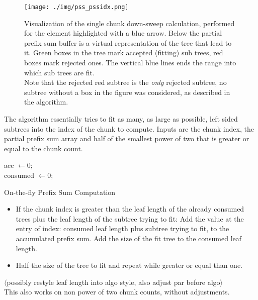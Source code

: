 \documentclass{tudscrreprt}
\newcommand{\markr}[1]{\textcolor{review}{$\langle$#1$\rangle$}}
\begin{document}
				\begin{figure}[!ht]
					\centering
					\texttt{[image: ./img/pss\_pssidx.png]}
					\caption{\label{fig:pss_pssidx}Visualization of the single chunk down-sweep calculation, performed for the element highlighted with a blue arrow. Below the partial prefix sum buffer is a virtual representation of the tree that lead to it. Green boxes in the tree mark accepted (fitting) sub trees, red boxes mark rejected ones. The vertical blue lines ends the range into which sub trees are fit. \\ Note that the rejected red subtree is the \emph{only} rejected subtree, no subtree without a box in the figure was considered, as described in the algorithm.}
				\end{figure}
				The algorithm essentially tries to fit as many, as large as possible, left sided subtrees into the index of the chunk to compute. Inputs are the chunk index, the partial prefix sum array and half of the smallest power of two that is greater or equal to the chunk count.
				\begin{algorithm}[!ht]
					\SetAlgoLined
					acc $\gets 0$; \\
					consumed $\gets 0$; \\
					\caption{On-the-fly Prefix Sum Computation}
				\end{algorithm}
				\begin{itemize}
					\item If the chunk index is greater than the leaf length of the already consumed trees plus the leaf length of the subtree trying to fit:
						\subitem Add the value at the entry of index: consumed leaf length plus subtree trying to fit, to the accumulated prefix sum.
						\subitem Add the size of the fit tree to the consumed leaf length.
					\item Half the size of the tree to fit and repeat while greater or equal than one.
				\end{itemize}
				\markr{possibly restyle leaf length into algo style, also adjust par before algo}\\
				This also works on non power of two chunk counts, without adjustments.
			
\end{document}
